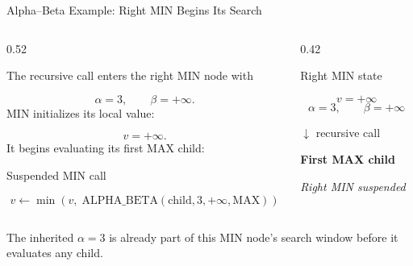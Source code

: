 \documentclass[aspectratio=169,10pt]{beamer}
\begin{document}



\begin{frame}[shrink=18]{Alpha--Beta Example: Right MIN Begins Its Search}

  \begin{columns}[T,onlytextwidth]

    \begin{column}{0.52\textwidth}

      The recursive call enters the right MIN node with

      \[
        \alpha=3,\qquad
        \beta=+\infty.
      \]
      MIN initializes its local value:

      \[
        v=+\infty.
      \]
      It begins evaluating its first MAX child:

      \begin{block}{Suspended MIN call}

        \[
          v \leftarrow
          \min\left(
            v,\;
            \text{ALPHA\_BETA}(\text{child},3,+\infty,\text{MAX})
          \right)
        \]
      \end{block}

    \end{column}

    \begin{column}{0.42\textwidth}

      \begin{block}{Right MIN state}

        \[
          v=+\infty
        \]
        \[
          \alpha=3,\qquad \beta=+\infty
        \]
      \end{block}

      \begin{center}

        $\downarrow$ recursive call

        \vspace{0.08in}

        \textbf{First MAX child}

        \vspace{0.08in}

        \textit{Right MIN suspended}

      \end{center}

    \end{column}

  \end{columns}

  \begin{keyidea}

    The inherited $\alpha=3$ is already part of this MIN node's search window before it evaluates any child.

  \end{keyidea}

\end{frame}
\end{document}
